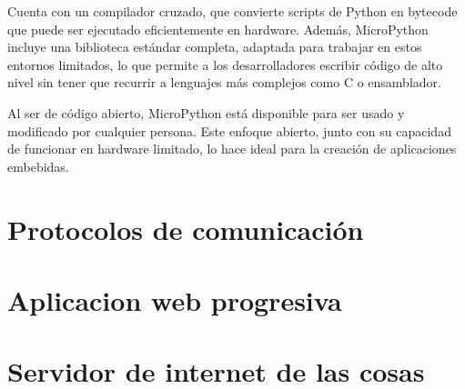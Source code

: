 Cuenta con un compilador cruzado, que convierte scripts de Python en bytecode que puede ser ejecutado eficientemente en hardware. Además, MicroPython incluye una biblioteca estándar completa, adaptada para trabajar en estos entornos limitados, lo que permite a los desarrolladores escribir código de alto nivel sin tener que recurrir a lenguajes más complejos como C o ensamblador.

Al ser de código abierto, MicroPython está disponible para ser usado y modificado por cualquier persona. Este enfoque abierto, junto con su capacidad de funcionar en hardware limitado, lo hace ideal para la creación de aplicaciones embebidas.


\section{Protocolos de comunicación}

\section{Aplicacion web progresiva}


\section{Servidor de internet de las cosas}





